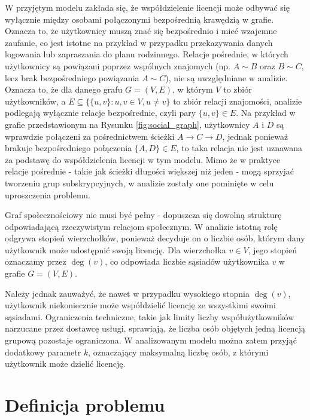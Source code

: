 W przyjętym modelu zakłada się, że współdzielenie licencji może odbywać się wyłącznie między osobami połączonymi bezpośrednią krawędzią w grafie. Oznacza to, że użytkownicy muszą znać się bezpośrednio i mieć wzajemne zaufanie, co jest istotne na przykład w przypadku przekazywania danych logowania lub zapraszania do planu rodzinnego. Relacje pośrednie, w których użytkownicy są powiązani poprzez wspólnych znajomych (np. \( A \sim B \) oraz \( B \sim C \), lecz brak bezpośredniego powiązania \( A \sim C \)), nie są uwzględniane w analizie. Oznacza to, że dla danego grafu \( G = (V, E) \),
w którym \( V \) to zbiór użytkowników, a \( E \subseteq \{ \{u,v\} : u,v \in V, u \neq v \} \) to zbiór relacji znajomości, analizie podlegają wyłącznie relacje bezpośrednie, czyli pary \( \{u, v\} \in E \).
Na przykład w grafie przedstawionym na Rysunku \ref{fig:social_graph}, użytkownicy \( A \) i \( D \) są wprawdzie połączeni za pośrednictwem ścieżki \( A \rightarrow C \rightarrow D \), jednak ponieważ brakuje bezpośredniego połączenia \( \{A,D\} \in E \), to taka relacja nie jest uznawana za podstawę do współdzielenia licencji w tym modelu.
Mimo że w praktyce relacje pośrednie - takie jak ścieżki długości większej niż jeden - mogą sprzyjać tworzeniu grup subskrypcyjnych, w analizie zostały one pominięte w celu uproszczenia problemu.

Graf społecznościowy nie musi być pełny - dopuszcza się dowolną strukturę odpowiadającą rzeczywistym relacjom społecznym. W analizie istotną rolę odgrywa stopień wierzchołków, ponieważ decyduje on o liczbie osób, którym dany użytkownik może udostępnić swoją licencję. Dla wierzchołka \( v \in V \), jego stopień oznaczamy przez \( \deg(v) \), co odpowiada liczbie sąsiadów użytkownika \( v \) w grafie \( G = (V, E) \).

Należy jednak zauważyć, że nawet w przypadku wysokiego stopnia \( \deg(v) \), użytkownik niekoniecznie może współdzielić licencję ze wszystkimi swoimi sąsiadami. Ograniczenia techniczne, takie jak limity liczby współużytkowników narzucane przez dostawcę usługi, sprawiają, że liczba osób objętych jedną licencją grupową pozostaje ograniczona. W analizowanym modelu można zatem przyjąć dodatkowy parametr \( k \), oznaczający maksymalną liczbę osób, z którymi użytkownik może dzielić licencję.


\section{Definicja problemu}

